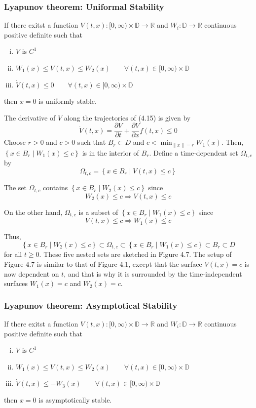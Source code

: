 \documentclass{article}
\newcommand{\mathbbD}{\mathbb{D}}
\newcommand{\mathbbR}{\mathbb{R}}
\begin{document}
\subsubsection{Lyapunov theorem: Uniformal Stability}
If there exitst a function $V(t,x):[0, \infty) \times \mathbbD \rightarrow
	\mathbbR$ and $W_i: \mathbb{D} \rightarrow \mathbb{R}$ continuous positive
definite such that
\begin{enumerate}[i)]
	\item $V \text{ is } C^1$
	\item $W_1(x) \leq V(t,x) \leq W_2(x) \qquad \forall (t,x) \in [0, \infty) \times \mathbb{D}$
	\item $\dot V(t,x) \leq 0 \qquad \forall (t,x) \in [0, \infty) \times \mathbb{D}$
\end{enumerate}
then $x=0$ is uniformly stable.
\begin{figure}[h]
	\centering
	\resizebox{0.45\textwidth}{!}{}
\end{figure}
\begin{frm-prf}
	The derivative of $V$ along the trajectories of (4.15) is given by
	$$
		\dot{V}(t, x)=\frac{\partial V}{\partial t}+\frac{\partial V}{\partial x} f(t, x) \leq 0
	$$
	Choose $r>0$ and $c>0$ such that $B_r \subset D$ and $c<\min _{\|x\|=r}
		W_1(x)$. Then, $\left\{x \in B_r \mid W_1(x) \leq c\right\}$ is in the interior
	of $B_r$. Define a time-dependent set $\Omega_{t, c}$ by $$ \Omega_{t,
			c}=\left\{x \in B_r \mid V(t, x) \leq c\right\} $$

	The set $\Omega_{t, c}$ contains $\left\{x \in B_r \mid W_2(x) \leq c\right\}$
	since $$ W_2(x) \leq c \Rightarrow V(t, x) \leq c $$

	On the other hand, $\Omega_{t, c}$ is a subset of $\left\{x \in B_r \mid W_1(x)
		\leq c\right\}$ since $$ V(t, x) \leq c \Rightarrow W_1(x) \leq c $$

	Thus, $$ \left\{x \in B_r \mid W_2(x) \leq c\right\} \subset \Omega_{t, c}
		\subset\left\{x \in B_r \mid W_1(x) \leq c\right\} \subset B_r \subset D $$ for
	all $t \geq 0$. These five nested sets are sketched in Figure 4.7. The setup of
	Figure 4.7 is similar to that of Figure 4.1, except that the surface $V(t,
		x)=c$ is now dependent on $t$, and that is why it is surrounded by the
	time-independent surfaces $W_1(x)=c$ and $W_2(x)=c$.
\end{frm-prf}
\subsubsection{Lyapunov theorem: Asymptotical Stability}
If there exitst a function $V(t,x):[0, \infty) \times \mathbbD \rightarrow
	\mathbbR$ and $W_i: \mathbb{D} \rightarrow \mathbb{R}$ continuous positive
definite such that
\begin{enumerate}[i)]
	\item $V \text{ is } C^1$
	\item $W_1(x) \leq V(t,x) \leq W_2(x) \qquad \forall (t,x) \in [0, \infty) \times \mathbb{D}$
	\item $\dot V(t,x) \leq -W_3(x) \qquad \forall (t,x) \in [0, \infty) \times \mathbb{D}$
\end{enumerate}
then $x=0$ is asymptotically stable.
\end{document}
